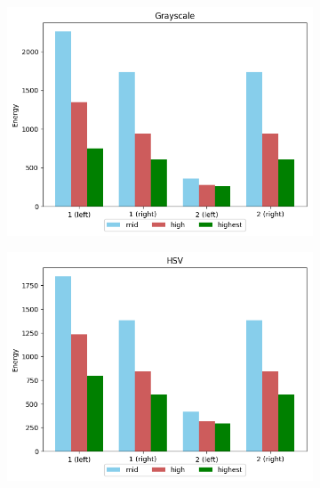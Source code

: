 \begin{figure}[H]
    \caption{Airplane STFT approach with Blackmanharris window for Grayscale (a) and HSV (b) colourspaces.}
    \centering
    \begin{subfigure}{.5\textwidth}
        \centering
        \includegraphics[scale=0.41]{images/appendix/stft/airplane/blackmanharris_Grayscale.png}
        \caption{}
    \end{subfigure}%
    \begin{subfigure}{.5\textwidth}
         \centering
          \includegraphics[scale=0.41]{images/appendix/stft/airplane/blackmanharris_HSV.png}
          \caption{}
    \end{subfigure}
    \fautor
\end{figure}

